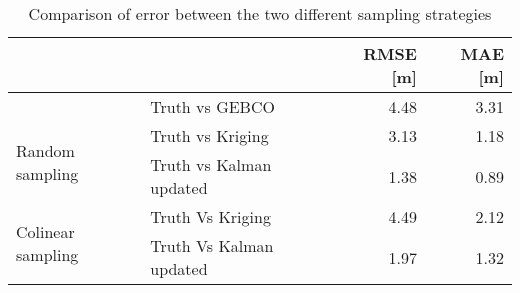 \begin{table}
\centering
\caption{Comparison of error between the two different sampling strategies }
\label{tab:random-vs-colinear-sampling}
\begin{tabular}{llrr}
\toprule
 &  & RMSE [m] & MAE [m] \\
\midrule
 & Truth vs GEBCO & 4.48 & 3.31 \\
\cline{1-2}
\multirow[c]{2}{*}{Random sampling} & Truth vs Kriging & 3.13 & 1.18 \\
 & Truth vs Kalman updated & 1.38 & 0.89 \\
\cline{1-2}
\multirow[c]{2}{*}{Colinear sampling} & Truth Vs Kriging & 4.49 & 2.12 \\
 & Truth Vs Kalman updated & 1.97 & 1.32 \\
\cline{1-2}
\bottomrule
\end{tabular}
\end{table}
